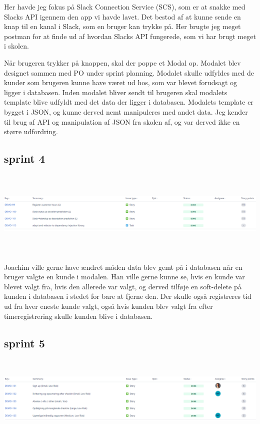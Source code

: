 \documentclass[11pt]{report}
\begin{document}
Her havde jeg fokus på Slack Connection Service (SCS), som er at snakke med Slacks API igennem den app vi havde lavet. 
Det bestod af at kunne sende en knap til en kanal i Slack, som en bruger kan trykke på. Her brugte jeg meget postman 
for at finde ud af hvordan Slacks API fungerede, som vi har brugt meget i skolen. 

Når brugeren trykker på knappen, skal der poppe et Modal op. Modalet blev designet sammen med PO under sprint planning. 
Modalet skulle udfyldes med de kunder som brugeren kunne have været ud hos, som var blevet forudsagt og ligger i 
databasen. Inden modalet bliver sendt til brugeren skal modalets template blive udfyldt med det data der ligger i 
databasen. Modalets template er bygget i JSON, og kunne derved nemt manipuleres med andet data. Jeg kender til brug 
af API og manipulation af JSON fra skolen af, og var derved ikke en større udfordring. 

\subsection*{sprint 4}
\begin{center} 
\includegraphics[height=4.13cm, width=15.92cm]{sprint4}
\end{center}

Joachim ville gerne have ændret måden data blev gemt på i databasen når en bruger valgte en kunde i modalen. 
Han ville gerne kunne se, hvis en kunde var blevet valgt fra, hvis den allerede var valgt, 
og derved tilføje en soft-delete på kunden i databasen i stedet for bare at fjerne den. 
Der skulle også registreres tid ud fra hver eneste kunde valgt, også hvis kunden blev valgt fra efter 
timeregistrering skulle kunden blive i databasen. 

\subsection*{sprint 5}
\begin{center} 
\includegraphics[height=4.13cm, width=15.92cm]{sprint5}
\end{center}
\end{document}
